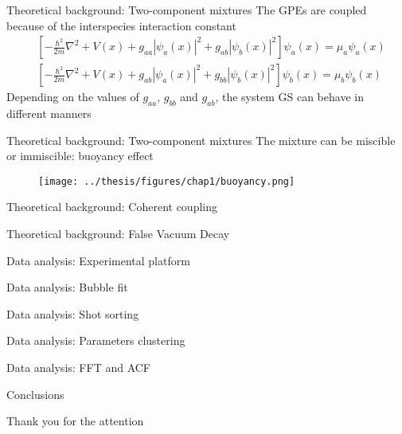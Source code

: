 \documentclass[handout]{beamer}
\newcommand{\backupbegin}{
    \newcounter{finalframe}
    \setcounter{finalframe}{\value{framenumber}}
}
\newcommand{\backupend}{
    \setcounter{framenumber}{\value{finalframe}}
}
\begin{document}
\begin{frame}{Theoretical background: Two-component mixtures}
    The GPEs are coupled because of the interspecies interaction constant
    \begin{align*}
        &\left[ -\frac{\hbar^2}{2m}\nabla^2 + V(x) + g_{aa}|\psi_a(x)|^2 + g_{ab}|\psi_b(x)|^2
        \right] \psi_a(x) = \mu_a \psi_a(x) \\
        &\left[ -\frac{\hbar^2}{2m}\nabla^2 + V(x) + g_{ab}|\psi_a(x)|^2 + g_{bb}|\psi_b(x)|^2
        \right] \psi_b(x) = \mu_b \psi_b(x)
    \end{align*}
    Depending on the values of $g_{aa}$, $g_{bb}$ and $g_{ab}$, the system GS can behave in different manners
\end{frame}

\begin{frame}{Theoretical background: Two-component mixtures}
    The mixture can be miscible or immiscible: buoyancy effect
    \begin{figure}
        \centering
        \texttt{[image: ../thesis/figures/chap1/buoyancy.png]}
    \end{figure}
\end{frame}

\begin{frame}{Theoretical background: Coherent coupling}
    
\end{frame}

\begin{frame}{Theoretical background: False Vacuum Decay}
    
\end{frame}

\begin{frame}{Data analysis: Experimental platform}

\end{frame}

\begin{frame}{Data analysis: Bubble fit}

\end{frame}

\begin{frame}{Data analysis: Shot sorting}

\end{frame}

\begin{frame}{Data analysis: Parameters clustering}

\end{frame}

\begin{frame}{Data analysis: FFT and ACF}

\end{frame}

\begin{frame}{Conclusions}
    
\end{frame}

\begin{frame}
    Thank you for the attention
\end{frame}

\backupbegin
\begin{frame}
    
\end{frame}
\backupend
\end{document}
